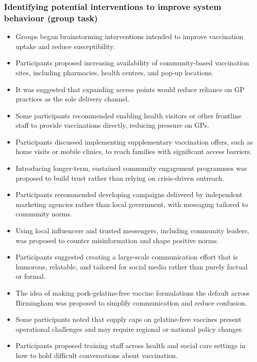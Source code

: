 \documentclass{article}
\begin{document}
\subsubsection{Identifying potential interventions to improve system behaviour (group task)}

\begin{itemize}
    \item Groups began brainstorming interventions intended to improve vaccination uptake and reduce susceptibility.
    \item Participants proposed increasing availability of community‑based vaccination sites, including pharmacies, health centres, and pop‑up locations.
    \item It was suggested that expanding access points would reduce reliance on GP practices as the sole delivery channel.
    \item Some participants recommended enabling health visitors or other frontline staff to provide vaccinations directly, reducing pressure on GPs.
    \item Participants discussed implementing supplementary vaccination offers, such as home visits or mobile clinics, to reach families with significant access barriers.
    \item Introducing longer‑term, sustained community engagement programmes was proposed to build trust rather than relying on crisis‑driven outreach.
    \item Participants recommended developing campaigns delivered by independent marketing agencies rather than local government, with messaging tailored to community norms.
    \item Using local influencers and trusted messengers, including community leaders, was proposed to counter misinformation and shape positive norms.
    \item Participants suggested creating a large‑scale communication effort that is humorous, relatable, and tailored for social media rather than purely factual or formal.
    \item The idea of making pork‑gelatine‑free vaccine formulations the default across Birmingham was proposed to simplify communication and reduce confusion.
    \item  Some participants noted that supply caps on gelatine‑free vaccines present operational challenges and may require regional or national policy changes.
    \item Participants proposed training staff across health and social care settings in how to hold difficult conversations about vaccination.

\end{itemize}
\end{document}
